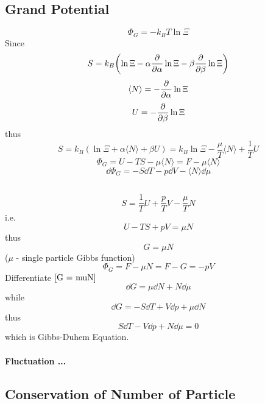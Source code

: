 \documentclass[UTF8]{ctexart} %
\numberwithin{equation}{subsection}
\begin{document}
\subsection{Grand Potential}
\begin{equation}\label{key}
\Phi_G = -k_B T\ln\Xi
\end{equation}
Since
\begin{equation}\label{key}
S = k_B\qty(\ln\Xi - \alpha\pdv{\alpha}\ln\Xi - \beta\pdv{\beta}
\ln\Xi)
\end{equation}
\begin{equation}\label{key}
\langle N\rangle = -\pdv{\alpha}\ln\Xi
\end{equation}
\begin{equation}\label{key}
U = -\pdv{\beta}\ln\Xi
\end{equation}
thus
\begin{equation}\label{key}
S = k_B(\ln\Xi + \alpha\langle N\rangle + \beta U) = k_B\ln\Xi - \dfrac{\mu}{T}\langle N\rangle + \dfrac{1}{T}U
\end{equation}
\begin{equation}\label{key}
\Phi_G = U - TS - \mu\langle N\rangle = F - \mu\langle N\rangle
\end{equation}
\begin{equation}\label{key}
\dd\Phi_G = -S\dd T -p\dd V -\langle N\rangle\dd\mu
\end{equation}

\subsection{}
\begin{equation}\label{key}
S = \dfrac{1}{T}U + \dfrac{p}{T}V - \dfrac{\mu}{T}N
\end{equation}
i.e.
\begin{equation}\label{key}
U -TS + pV = \mu N
\end{equation}
thus
\begin{equation}\label{G = muN}
G = \mu N
\end{equation}
($\mu$ - single particle Gibbs function)
\begin{equation}\label{key}
\Phi_G = F - \mu N = F - G = -pV
\end{equation}
Differentiate $\eqref{G = muN}$
\begin{equation}\label{key}
\dd G = \mu\dd N + N\dd\mu
\end{equation}
while
\begin{equation}\label{key}
\dd G = -S\dd T + V\dd p +\mu\dd N
\end{equation}
thus
\begin{equation}\label{key}
S\dd T - V\dd p + N\dd\mu = 0
\end{equation}
which is Gibbs-Duhem Equation.\\
\paragraph{Fluctuation ...}

\subsection{}

\subsection{Conservation of Number of Particle}
\end{document}
